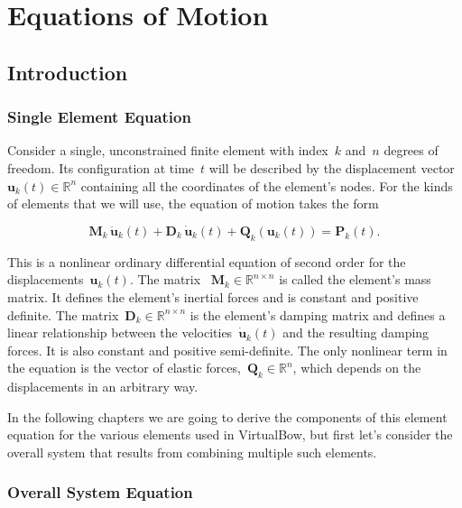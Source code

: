 
\chapter{Equations of Motion}

\section{Introduction}

\subsection{Single Element Equation}

Consider a single, unconstrained finite element with index~$k$ and~$n$ degrees of freedom.
Its configuration at time~$t$ will be described by the displacement vector~$\boldsymbol{u}_{k}(t) \in \mathbb{R}^n$ containing all the coordinates of the element's nodes.
For the kinds of elements that we will use, the equation of motion takes the form

\begin{equation}
\boldsymbol{M}_{k}\,\ddot{\boldsymbol{u}}_{k}(t) + \boldsymbol{D}_{k}\,\dot{\boldsymbol{u}}_{k}(t) + \boldsymbol{Q}_{k}(\boldsymbol{u}_{k}(t)) = \boldsymbol{P}_{k}(t).\label{eq:local-equation-of-motion}
\end{equation}

This is a nonlinear ordinary differential equation of second order for the displacements~$\boldsymbol{u}_{k}(t)$.
The matrix ~$\boldsymbol{M}_{k} \in \mathbb{R}^{n \times n}$ is called the element's mass matrix.
It defines the element's inertial forces and is constant and positive definite.
The matrix~$\boldsymbol{D}_{k} \in \mathbb{R}^{n \times n}$ is the element's damping matrix and defines a linear relationship between the velocities~$\dot{\boldsymbol{u}}_{k}(t)$ and the resulting damping forces.
It is also constant and positive semi-definite.
The only nonlinear term in the equation is the vector of elastic forces,~$\boldsymbol{Q}_{k} \in \mathbb{R}^n$, which depends on the displacements in an arbitrary way.

In the following chapters we are going to derive the components of this element equation for the various elements used in VirtualBow, but first let's consider the overall system that results from combining multiple such elements.

\newpage
\subsection{Overall System Equation}


